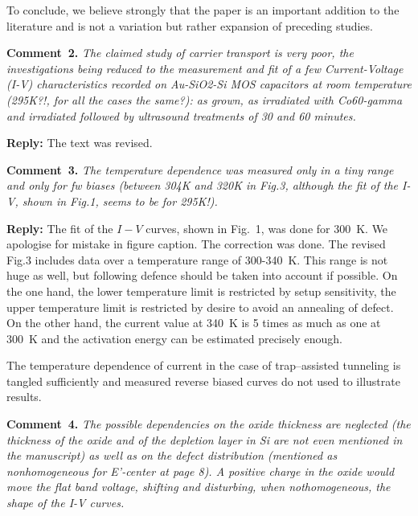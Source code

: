 \documentclass[aip,jap,preprint]{revtex4-1}
\begin{document}
To conclude, we believe strongly  that the paper is an important addition to the literature and is
not a variation but rather expansion of preceding studies.


\noindent
\textcolor[rgb]{0.00,0.50,1.00}{\textbf{Comment~2.}}
\emph{The claimed study of carrier transport is very poor, the investigations being reduced to the measurement and fit of a few Current-Voltage (I-V) characteristics recorded on Au-SiO2-Si MOS capacitors at room temperature (295K?!, for all the cases the same?): as grown, as irradiated with Co60-gamma and irradiated followed by ultrasound treatments of 30 and 60 minutes.}

\noindent
\textcolor[rgb]{0.51,0.00,0.00}{\textbf{Reply:}}
The text was revised.



\noindent
\textcolor[rgb]{0.00,0.50,1.00}{\textbf{Comment~3.}}
\emph{The temperature dependence was measured only in a tiny range and only for fw biases (between 304K and 320K in Fig.3, although the fit of the I-V, shown in Fig.1, seems to be for 295K!).}


\noindent
\textcolor[rgb]{0.51,0.00,0.00}{\textbf{Reply:}}
The fit of the $I-V$ curves, shown in Fig.~1, was done for 300~K.
We apologise for mistake in figure caption.
The correction was done.
The revised Fig.3 includes data over a temperature range of 300-340~K.
This range is not huge as well, but following defence should be taken into account if possible.
On the one hand, the lower temperature limit is restricted by setup sensitivity,
the upper temperature limit is restricted by desire to avoid an annealing of defect.
On the other hand, the current value at 340~K is 5 times as much as one at 300~K
and the activation energy can be estimated precisely enough.

The temperature dependence of current in the case of  trap--assisted tunneling is tangled sufficiently  \cite{TAT:Gilmore,TAT:GopalSST,TAT:Gopal} and
measured reverse biased curves do not used to illustrate  results.


\noindent
\textcolor[rgb]{0.00,0.50,1.00}{\textbf{Comment~4.}}
\emph{The possible dependencies on the oxide thickness are neglected (the thickness of the oxide and of the depletion layer in Si are not even mentioned in the manuscript) as well as on the defect distribution (mentioned as nonhomogeneous for E’-center at page 8). A positive charge in the oxide would move the flat band voltage, shifting and disturbing, when nothomogeneous, the shape of the I-V curves.}
\end{document}
